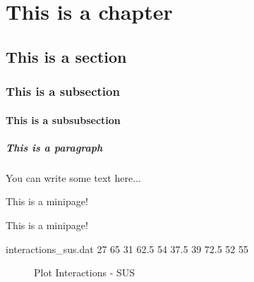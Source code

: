 \chapter{This is a chapter}

\section{This is a section}

\subsection{This is a subsection}

\subsubsection{This is a subsubsection}

\paragraph{This is a paragraph}
You can write some text here...\\

\begin{minipage}{0.5 \textwidth}
    This is a minipage!
\end{minipage}
\begin{minipage}{0.5 \textwidth}
    This is a minipage!
\end{minipage}

\begin{filecontents}{interactions_sus.dat}
	27 65
	31 62.5
	54 37.5
	39 72.5
	52 55
\end{filecontents}

\begin{figure}[H] \centering
	\caption{Plot Interactions - SUS}
\end{figure}